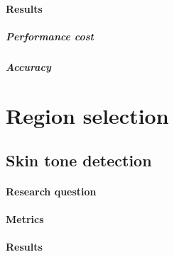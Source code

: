 \paragraph{Results}
\subparagraph{Performance cost}
\subparagraph{Accuracy}


\section{Region selection}
\label{section:region_selection}
\subsection{Skin tone detection}
\label{section:skin_tone_detection}
\paragraph{Research question}

\paragraph{Metrics}
\paragraph{Results}



